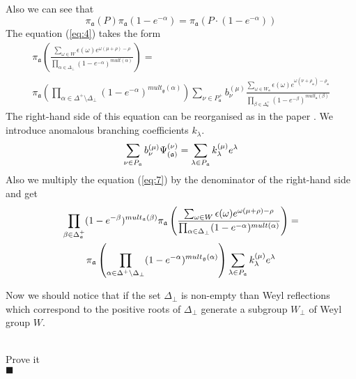 \documentclass[a4paper,12pt]{article}
\theoremstyle{definition} \newtheorem{Def}{Definition}
\newenvironment{comment}
{\par\noindent{\bf TODO}\\}
{\\\hfill$\scriptstyle\blacksquare$\par}
\begin{document}
Also we can see that 
\begin{equation}
  \label{eq:6}
  \pi_{\mathfrak{a}} (P) \pi_{\mathfrak{a}}(1-e^{-\alpha})=\pi_{\mathfrak{a}}\left(P\cdot (1-e^{-\alpha})\right)
\end{equation}
The equation (\ref{eq:4}) takes the form
\begin{multline}
  \label{eq:7}
  \pi_{\mathfrak{a}}\left(\frac{\sum_{\omega\in W} \epsilon(\omega) e^{\omega(\mu+\rho)-\rho}}{\prod_{\alpha\in\Delta_{\bot}}(1-e^{-\alpha})^{mult(\alpha)}}\right) = \\
  \pi_{\mathfrak{a}}\left(\prod_{\alpha\in \Delta^{+}\setminus \Delta_{\bot}}(1-e^{-\alpha})^{mult_{\mathfrak{g}}(\alpha)} \right)\sum_{\nu\in P^{+}_{\mathfrak{a}}}b^{(\mu)}_{\nu}
  \frac{\sum_{\omega\in W_{\mathfrak{a}}}\epsilon(\omega)e^{\omega(\nu+\rho_{\mathfrak{a}})-\rho_{\mathfrak{a}}}}{\prod_{\beta\in \Delta_{\mathfrak{a}}^{+}}(1-e^{-\beta})^{mult_{\mathfrak{a}}(\beta)}}
\end{multline}
The right-hand side of this equation can be reorganised as in the paper \cite{ilyin812pbc}. We introduce anomalous branching coefficients $k_{\lambda}$.
\begin{equation}
  \label{eq:10}
  \sum_{\nu \in P_{\frak{a}}}b_{\nu }^{\left( \mu \right) }\Psi _{\left( \frak{%
        a}\right) }^{\left( \nu \right) }=\sum_{\lambda \in P_{\frak{a}}}k_{\lambda
  }^{\left( \mu \right) }e^{\lambda } 
\end{equation}
Also we multiply the equation (\ref{eq:7}) by the denominator of the right-hand side and get
\begin{multline}
  \label{eq:12}
  \prod_{\beta\in \Delta_{\mathfrak{a}}^{+}}(1-e^{-\beta})^{mult_{\mathfrak{a}}(\beta)}  \pi_{\mathfrak{a}}\left(\frac{\sum_{\omega\in W} \epsilon(\omega) e^{\omega(\mu+\rho)-\rho}}{\prod_{\alpha\in\Delta_{\bot}}(1-e^{-\alpha})^{mult(\alpha)}}\right) = \\
  \pi_{\mathfrak{a}}\left(\prod_{\alpha\in \Delta^{+}\setminus \Delta_{\bot}}(1-e^{-\alpha})^{mult_{\mathfrak{g}}(\alpha)} \right)
\sum_{\lambda \in P_{\frak{a}}}k_{\lambda
}^{\left( \mu \right) }e^{\lambda } 
\end{multline}

Now we should notice that if the set $\Delta_{\bot}$ is non-empty than Weyl reflections which correspond to the positive roots of $\Delta_{\bot}$ generate a subgroup $W_{\bot}$ of Weyl group $W$. 

\begin{comment}
  Prove it  
\end{comment}
\end{document}
